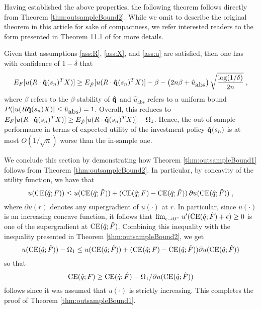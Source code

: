 Having established the above properties, the following theorem follows directly from
Theorem \ref{thm:outsampleBound2}. While we omit to describe the original theorem in this
article for sake of compactness, we refer interested readers to the form presented in
Theorem 11.1 of \cite{mohri2012foundations} for more details.

\begin{thm}\label{thm:outsampleBound2}
  Given that assumptions \ref{ass:R}, \ref{ass:X}, and \ref{ass:u} are satisfied, then one
  has with confidence of $1-\delta$ that
  \[
    E_{F}[u(R\cdot{\bold{{\hat{q}}}}(s_n)^TX)] \geq E_{\hat{F}}[u(R\cdot{\bold{{\hat{q}}}}(s_n)^TX)] - \beta -
    \left(2n\beta+\hat{u}_{\mbox{abs}}\right)\sqrt{\frac{\log(1/\delta)}{2n}}\;,
  \]
  where $\beta$ refers to the $\beta$-stability of ${\bold{{\hat{q}}}}$ and $\hat{u}_{\mbox{abs}}$
  refers to a uniform bound $P(|u(R{\bold{{\hat{q}}}}(s_n)X)|\leq \hat{u}_{\mbox{abs}})=1$.
  Overall, this reduces to
  $E_{F}[u(R\cdot{\bold{{\hat{q}}}}(s_n)^TX)] \geq E_{\hat{F}}[u(R\cdot{\bold{{\hat{q}}}}(s_n)^TX)] - \Omega_1$. Hence,
  the out-of-sample performance in terms of expected utility of the investment policy
  ${\bold{{\hat{q}}}}(s_n)$ is at most $O(1/\sqrt{n})$ worse than the in-sample one.
\end{thm}

We conclude this section by demonstrating how Theorem \ref{thm:outsampleBound1} follows
from Theorem \ref{thm:outsampleBound2}. In particular, by concavity of the utility
function, we have that
\[
  u(\operatorname{CE}({\hat{q}};F))\leq u(\operatorname{CE}({\hat{q}};{\hat{F}}))+(\operatorname{CE}({\hat{q}};F)-\operatorname{CE}({\hat{q}};{\hat{F}}))\,\partial
  u(\operatorname{CE}({\hat{q}};{\hat{F}}))\;,
\] 
where $\partial u(r)$ denotes any supergradient of $u(\cdot)$ at $r$. In particular, since
$u(\cdot)$ is an increasing concave function, it follows that
$\lim_{\epsilon\to0^-}u'(\operatorname{CE}({\hat{q}};{\hat{F}})+\epsilon)\geq 0$ is one of the supergradient at
$\operatorname{CE}({\hat{q}};{\hat{F}})$. Combining this inequality with the inequality presented in Theorem
\ref{thm:outsampleBound2}, we get
\[ 
  u(\operatorname{CE}({\hat{q}};{\hat{F}})) - \Omega_1 \leq
  u(\operatorname{CE}({\hat{q}};{\hat{F}}))+(\operatorname{CE}({\hat{q}};F)-\operatorname{CE}({\hat{q}};{\hat{F}}))\partial u(\operatorname{CE}({\hat{q}};{\hat{F}}))
\]
so that
\[
  \operatorname{CE}({\hat{q}};F) \geq \operatorname{CE}({\hat{q}};{\hat{F}}) - \Omega_1/\partial u(\operatorname{CE}({\hat{q}};{\hat{F}}))
\]
follows since it was assumed that $u(\cdot)$ is strictly increasing. This completes the
proof of Theorem \ref{thm:outsampleBound1}.


